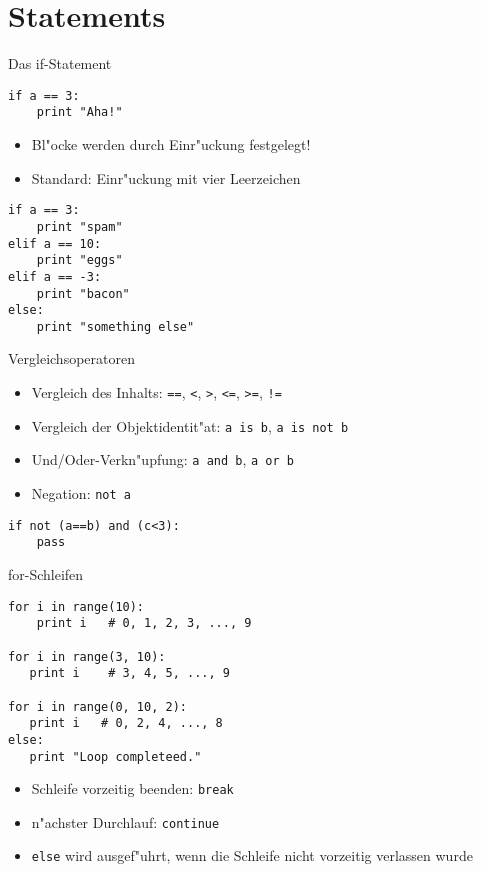 \section{Statements}

\begin{frame}[fragile]{Das if-Statement}
\begin{lstlisting}[style=Python]
if a == 3:
    print "Aha!"
\end{lstlisting}
\begin{itemize}
\item Bl"ocke werden durch Einr"uckung festgelegt!
\item Standard: Einr"uckung mit vier Leerzeichen
\end{itemize}
\begin{lstlisting}
if a == 3:
    print "spam"
elif a == 10:
    print "eggs"
elif a == -3:
    print "bacon"
else:
    print "something else"
\end{lstlisting}
\end{frame}

\begin{frame}[fragile]{Vergleichsoperatoren}
\begin{itemize}
\item Vergleich des Inhalts: \texttt{==}, \texttt{<}, \texttt{>}, \texttt{<=}, \texttt{>=}, \texttt{!=}
\item Vergleich der Objektidentit"at: \lstinline{a is b}, \lstinline{a is not b}\item Und/Oder-Verkn"upfung: \lstinline{a and b}, \lstinline{a or b}
\item Negation: \lstinline{not a}
\end{itemize}
\begin{lstlisting}
if not (a==b) and (c<3):
    pass
\end{lstlisting}
\end{frame}

\begin{frame}[fragile]{for-Schleifen}
\begin{lstlisting}[style=Python]
for i in range(10):
    print i   # 0, 1, 2, 3, ..., 9

for i in range(3, 10):
   print i    # 3, 4, 5, ..., 9

for i in range(0, 10, 2):
   print i   # 0, 2, 4, ..., 8
else:
   print "Loop completeed."
\end{lstlisting}
\begin{itemize}
\item Schleife vorzeitig beenden: \lstinline{break}
\item n"achster Durchlauf: \lstinline{continue}
\item \lstinline{else} wird ausgef"uhrt, wenn die Schleife nicht vorzeitig verlassen wurde
\end{itemize}
\end{frame}

